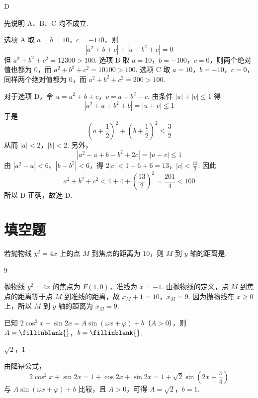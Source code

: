\begin{answer}
D
\end{answer}

\begin{solution}
先说明 A、B、C 均不成立.

选项 A 取 \(a=b=10\)，\(c=-110\)，则
\[
|a^2+b+c|+|a+b^2+c|=0
\]
但 \(a^2+b^2+c^2=12300>100\). 选项 B 取 \(a=10\)，\(b=-100\)，\(c=0\)，则两个绝对值也都为 \(0\)，而 \(a^2+b^2+c^2=10100>100\). 选项 C 取 \(a=10\)，\(b=-10\)，\(c=0\)，同样两个绝对值都为 \(0\)，而 \(a^2+b^2+c^2=200>100\).

对于选项 D，令
\(u=a^2+b+c\)，\(v=a+b^2-c\).
由条件 \(|u|+|v|\leqslant1\) 得
\[
|a^2+a+b^2+b|=|u+v|\leqslant1
\]
于是
\[
\left(a+\frac12\right)^2+\left(b+\frac12\right)^2\leqslant\frac32
\]
从而 \(|a|<2\)，\(|b|<2\). 另外，
\[
|a^2-a+b-b^2+2c|=|u-v|\leqslant1
\]
由 \(|a^2-a|<6\)、\(|b-b^2|<6\)，得
\(2|c|<1+6+6=13\)，\(|c|<\frac{13}{2}\).
因此
\[
a^2+b^2+c^2<4+4+\left(\frac{13}{2}\right)^2=\frac{201}{4}<100
\]
所以 D 正确，故选 D.
\end{solution}

\section{填空题}

\begin{problem}
若抛物线 \( y^2=4x \) 上的点 \(M\) 到焦点的距离为 \( 10 \)，则 \(M\) 到 \( y \) 轴的距离是\fillinblank{}.
\end{problem}

\begin{answer}
9
\end{answer}

\begin{solution}
抛物线 \(y^2=4x\) 的焦点为 \(F(1,0)\)，准线为 \(x=-1\). 由抛物线的定义，点 \(M\) 到焦点的距离等于点 \(M\) 到准线的距离，故
\(x_M+1=10\)，\(x_M=9\).
因为抛物线在 \(x\geqslant0\) 上，所以 \(M\) 到 \(y\) 轴的距离为 \(x_M=9\).
\end{solution}

\begin{problem}
已知 \( 2\cos^2x+\sin 2x=A\sin(\omega x+\varphi)+b \)（\( A>0 \)），则 \( A=\fillinblank{} \)，\( b=\fillinblank{} \).
\end{problem}

\begin{answer}
\(\sqrt2\)，\(1\)
\end{answer}

\begin{solution}
由降幂公式，
\[
2\cos^2x+\sin2x=1+\cos2x+\sin2x
 =1+\sqrt2\sin\left(2x+\frac\pi4\right)
\]
与 \(A\sin(\omega x+\varphi)+b\) 比较，且 \(A>0\)，可得 \(A=\sqrt2\)，\(b=1\).
\end{solution}

